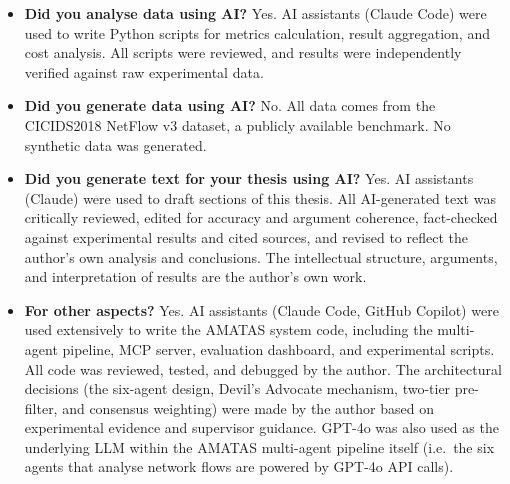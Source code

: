 \documentclass[../main.tex]{subfiles}
\begin{document}
\begin{itemize}[leftmargin=1.5em, itemsep=0.3em]
  \item \textbf{Did you analyse data using AI?} Yes. AI assistants (Claude Code) were used to write Python scripts for metrics calculation, result aggregation, and cost analysis. All scripts were reviewed, and results were independently verified against raw experimental data.

  \item \textbf{Did you generate data using AI?} No. All data comes from the CICIDS2018 NetFlow v3 dataset, a publicly available benchmark. No synthetic data was generated.

  \item \textbf{Did you generate text for your thesis using AI?} Yes. AI assistants (Claude) were used to draft sections of this thesis. All AI-generated text was critically reviewed, edited for accuracy and argument coherence, fact-checked against experimental results and cited sources, and revised to reflect the author's own analysis and conclusions. The intellectual structure, arguments, and interpretation of results are the author's own work.

  \item \textbf{For other aspects?} Yes. AI assistants (Claude Code, GitHub Copilot) were used extensively to write the AMATAS system code, including the multi-agent pipeline, MCP server, evaluation dashboard, and experimental scripts. All code was reviewed, tested, and debugged by the author. The architectural decisions (the six-agent design, Devil's Advocate mechanism, two-tier pre-filter, and consensus weighting) were made by the author based on experimental evidence and supervisor guidance. GPT-4o was also used as the underlying LLM within the AMATAS multi-agent pipeline itself (i.e.\ the six agents that analyse network flows are powered by GPT-4o API calls).
\end{itemize}

\newpage
\end{document}
